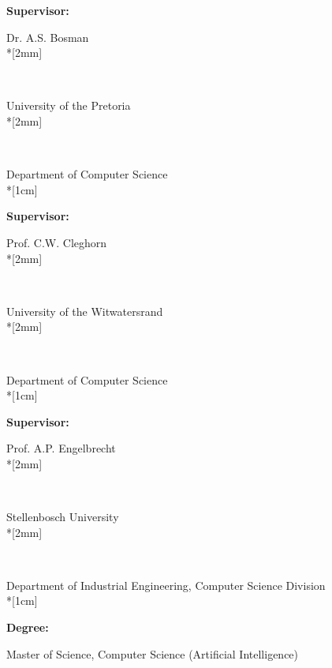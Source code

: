 \pagestyle{empty}
\vspace*{\fill}
\noindent
\parbox{4cm}{\textbf{Supervisor:}} Dr. A.S. Bosman \\*[2mm]
\parbox{4cm}{\textbf{~}} University of the Pretoria \\*[2mm]
\parbox{4cm}{\textbf{~}} Department of Computer Science\\*[1cm]
\parbox{4cm}{\textbf{Supervisor:}} Prof. C.W. Cleghorn \\*[2mm]
\parbox{4cm}{\textbf{~}} University of the Witwatersrand\\*[2mm]
\parbox{4cm}{\textbf{~}} Department of Computer Science\\*[1cm]
\parbox{4cm}{\textbf{Supervisor:}} Prof. A.P. Engelbrecht \\*[2mm]
\parbox{4cm}{\textbf{~}} Stellenbosch University\\*[2mm]
\parbox{4cm}{\textbf{~}} Department of Industrial Engineering, Computer Science Division\\*[1cm]
\parbox{4cm}{\textbf{Degree:}} Master of Science, Computer Science (Artificial Intelligence)
\newpage
